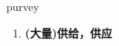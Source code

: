 
\begin{frame}
{\huge purvey}
\begin{center}
\begin{enumerate}\Large
  \item \textbf{(大量)供给，供应}
\end{enumerate}
\end{center}
\end{frame}
